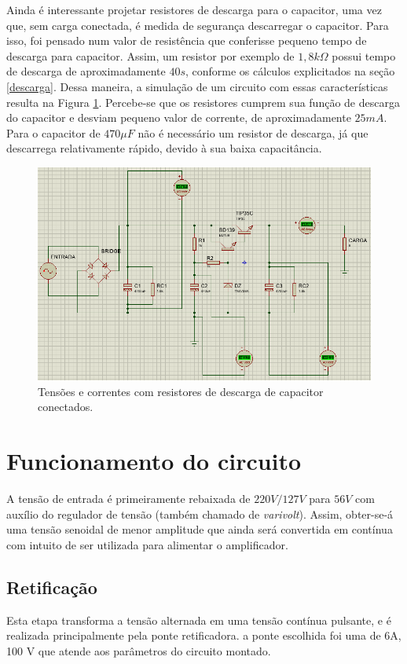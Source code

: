 \documentclass[a4paper,12pt,oneside,openany,table,xcdraw]{article}
\begin{document}
Ainda é interessante projetar resistores de descarga para o capacitor, uma vez que, sem carga conectada, é medida de segurança descarregar o capacitor.
Para isso, foi pensado num valor de resistência que conferisse pequeno tempo de descarga para capacitor. Assim, um resistor por exemplo de $1,8k\Omega$ possui tempo de descarga de aproximadamente $40s$, conforme os cálculos explicitados na seção \ref{descarga}. Dessa maneira, a simulação de um circuito com essas características resulta na Figura \ref{sim3}. Percebe-se que os resistores cumprem sua função de descarga do capacitor e desviam pequeno valor de corrente, de aproximadamente $25mA$. Para o capacitor de $470\mu F$ não é necessário um resistor de descarga, já que descarrega relativamente rápido, devido à sua baixa capacitância.

\begin{figure}[H]
\centering
\captionsetup{font=scriptsize}
\includegraphics[width=16cm]{sim3}
\caption{Tensões e correntes com resistores de descarga de capacitor conectados.}
\label{sim3}
\end{figure}

\newpage
\section{Funcionamento do circuito}
A tensão de entrada é primeiramente rebaixada de $220V/127V$ para $56V$ com auxílio do regulador de tensão (também chamado de \emph{varivolt}). Assim, obter-se-á uma tensão senoidal de menor amplitude que ainda será convertida em contínua com intuito de ser utilizada para alimentar o amplificador.

\subsection{Retificação}
Esta etapa transforma a tensão alternada em uma tensão contínua pulsante, e é realizada principalmente pela ponte retificadora. a ponte escolhida foi uma de 6A, 100 V que atende aos parâmetros do circuito montado.
\end{document}
